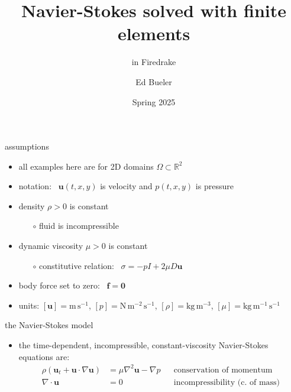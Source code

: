 \documentclass[10pt,hyperref]{beamer}
\title{Navier-Stokes solved with finite elements}
\subtitle{in Firedrake}
\author{Ed Bueler}
\institute{MATH 692 Fluids \& Solids Seminar}
\date{Spring 2025}
\newcommand{\bbf}{\mathbf{f}}
\newcommand{\bu}{\mathbf{u}}
\newcommand{\bzero}{\bm{0}}
\newcommand{\grad}{\nabla}
\newcommand{\Div}{\nabla\cdot}
\newcommand{\RR}{\mathbb{R}}
\begin{document}
\beamertemplatenavigationsymbolsempty

\begin{frame}
  \maketitle
\end{frame}


\begin{frame}{assumptions}

\begin{itemize}
\item all examples here are for 2D domains $\Omega \subset \RR^2$
\item notation: \, $\bu(t,x,y)$ is velocity and $p(t,x,y)$ is pressure
\item density $\rho>0$ is constant
    \begin{itemize}
    \item[$\circ$] fluid is incompressible
    \end{itemize}
\item dynamic viscosity $\mu>0$ is constant
    \begin{itemize}
    \item[$\circ$] constitutive relation: \, $\sigma = -p I + 2 \mu D\bu$
    \end{itemize}
\item body force set to zero: \, $\bbf = \bzero$

\bigskip
\item units: $[\bu]=\text{m}\,\text{s}^{-1}$, $[p]=\text{N}\,\text{m}^{-2}\,\text{s}^{-1}$, $[\rho]=\text{kg}\,\text{m}^{-3}$, $[\mu]=\text{kg}\,\text{m}^{-1}\,\text{s}^{-1}$
\end{itemize}
\end{frame}


\begin{frame}{the Navier-Stokes model}

\begin{itemize}
\item the time-dependent, incompressible, constant-viscosity Navier-Stokes equations are:
\begin{align*}
\rho\left(\bu_t + \bu \cdot \grad \bu\right) &= \mu \grad^2 \bu - \grad p & &\text{conservation of momentum} \\
\Div \bu &= 0 & &\text{incompressibility (c.~of mass)}
\end{align*}
\end{itemize}
\end{frame}
\end{document}
